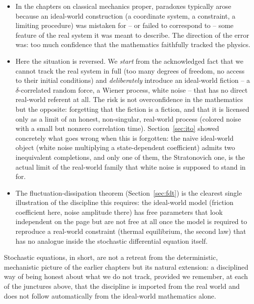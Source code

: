\begin{itemize}[leftmargin=1.6em]
\item In the chapters on classical mechanics proper, paradoxes typically
arose because an ideal-world construction (a coordinate system, a
constraint, a limiting procedure) was mistaken for -- or failed to
correspond to -- some feature of the real system it was meant to describe.
The direction of the error was: too much confidence that the mathematics
faithfully tracked the physics.
\item Here the situation is reversed. We \emph{start} from the acknowledged
fact that we cannot track the real system in full (too many degrees of
freedom, no access to their initial conditions) and \emph{deliberately}
introduce an ideal-world fiction -- a $\delta$-correlated random force,
a Wiener process, white noise -- that has no direct real-world referent at
all. The risk is not overconfidence in the mathematics but the opposite:
forgetting that the fiction is a fiction, and that it is licensed only as
a limit of an honest, non-singular, real-world process (colored noise
with a small but nonzero correlation time). Section~\ref{sec:ito} showed
concretely what goes wrong when this is forgotten: the naive ideal-world
object (white noise multiplying a state-dependent coefficient) admits two
inequivalent completions, and only one of them, the Stratonovich one, is
the actual limit of the real-world family that white noise is supposed to
stand in for.
\item The fluctuation-dissipation theorem (Section~\ref{sec:fdt}) is the
clearest single illustration of the discipline this requires: the
ideal-world model (friction coefficient here, noise amplitude there) has
free parameters that look independent on the page but are not free at all
once the model is required to reproduce a real-world constraint
(thermal equilibrium, the second law) that has no analogue inside the
stochastic differential equation itself.
\end{itemize}

Stochastic equations, in short, are not a retreat from the deterministic,
mechanistic picture of the earlier chapters but its natural extension: a
disciplined way of being honest about what we do not track, provided we
remember, at each of the junctures above, that the discipline is imported
from the real world and does not follow automatically from the ideal-world
mathematics alone.


